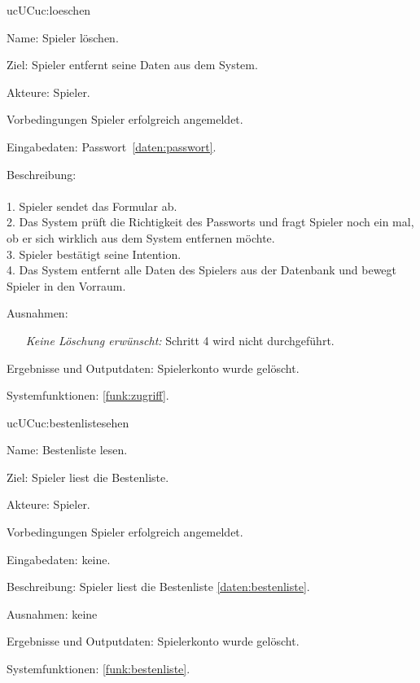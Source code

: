 \begin{description}[leftmargin=5em, style=sameline]
	\begin{lhp}{uc}{UC}{uc:loeschen}
		\item [Name:] Spieler löschen.
		\item [Ziel:] Spieler entfernt seine Daten aus dem System.
		\item [Akteure:] Spieler.
		\item [Vorbedingungen] Spieler erfolgreich angemeldet.
		\item [Eingabedaten:] Passwort~\ref{daten:passwort}.
		\item [Beschreibung:] \hfill\\ \hfill\\
				1. Spieler sendet das Formular ab.\\
				2. Das System prüft die Richtigkeit des Passworts und fragt Spieler noch ein mal, ob er sich wirklich aus dem System entfernen möchte.\\
				3. Spieler bestätigt seine Intention.\\
				4. Das System entfernt alle Daten des Spielers aus der Datenbank und bewegt Spieler in den Vorraum.\\
		\item [Ausnahmen:] \hfill
			\begin{itemize} 
				\item[] \textit{Keine Löschung erwünscht:} Schritt 4 wird nicht durchgeführt.
				
			\end{itemize}
		\item [Ergebnisse und Outputdaten:] Spielerkonto wurde gelöscht.	
		\item [Systemfunktionen:] \ref{funk:zugriff}.
	\end{lhp}
   
	\begin{lhp}{uc}{UC}{uc:bestenlistesehen}
    	\item [Name:] Bestenliste lesen.
    	\item [Ziel:] Spieler liest die Bestenliste.
    	\item [Akteure:] Spieler.
    	\item [Vorbedingungen] Spieler erfolgreich angemeldet.
    	\item [Eingabedaten:] keine.
    	\item [Beschreibung:] Spieler liest die Bestenliste \ref{daten:bestenliste}.
    	\item [Ausnahmen:] keine
    	\item [Ergebnisse und Outputdaten:] Spielerkonto wurde gelöscht.	
    	\item [Systemfunktionen:] \ref{funk:bestenliste}.
    \end{lhp}


\end{description}
